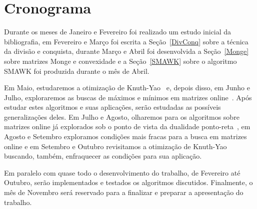\section{Cronograma}
Durante os meses de Janeiro e Fevereiro foi realizado um estudo inicial da bibliografia, em Fevereiro e Março foi escrita a Seção~\ref{DivConq} sobre a técnica da divisão e conquista, durante Março e Abril foi desenvolvida a Seção~\ref{Monge} sobre matrizes Monge e convexidade e a Seção~\ref{SMAWK} sobre o algoritmo SMAWK foi produzida durante o mês de Abril.  

Em Maio, estudaremos a otimização de Knuth-Yao~\cite{Bein:2009,Knuth:1971,Yao:1980} e, depois disso, em Junho e Julho, exploraremos as buscas de máximos e mínimos em matrizes online~\cite{Galil:1992,Brucker:1995}. Após estudar estes algoritmos e suas aplicações, serão estudadas as possíveis generalizações deles. Em Julho e Agosto, olharemos para os algoritmos sobre matrizes online já explorados sob o ponto de vista da dualidade ponto-reta~\cite{Berg:2000}, em Agosto e Setembro exploramos condições mais fracas para a busca em matrizes online e em Setembro e Outubro revisitamos a otimização de Knuth-Yao buscando, também, enfraquecer as condições para sua aplicação. 

Em paralelo com quase todo o desenvolvimento do trabalho, de Fevereiro até Outubro, serão implementados e testados os algoritmos discutidos. Finalmente, o mês de Novembro será reservado para a finalizar e preparar a apresentação do trabalho.
